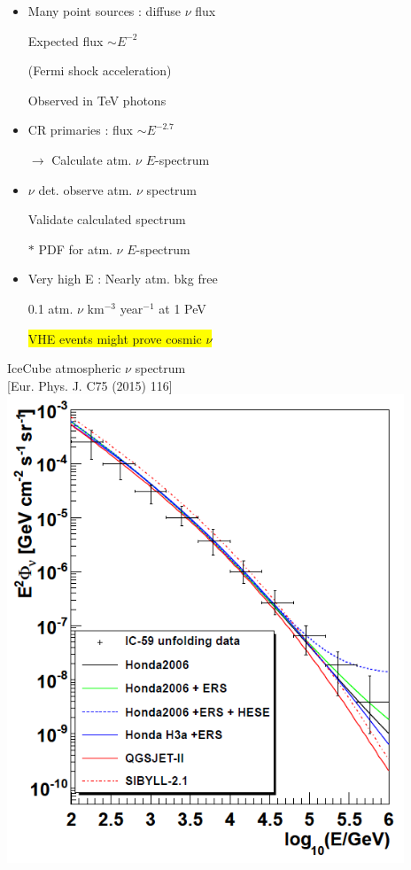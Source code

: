 \twocolumn
\begin{itemize}
\item Many point sources : diffuse $\nu$ flux
\item[] Expected flux $\sim E^{-2}$
\item[] (Fermi shock acceleration)
\item[] Observed in TeV photons
\item CR primaries : flux $\sim E^{-2.7}$
\item[] $\rightarrow$ Calculate atm. $\nu$ $E$-spectrum
\item $\nu$ det. observe atm. $\nu$ spectrum
\item[] Validate calculated spectrum
\item[$\ast$] {\blue PDF for atm. $\nu$ $E$-spectrum}
\item Very high E : Nearly atm. bkg free
\item[] 0.1 atm. $\nu$ km$^{-3}$ year$^{-1}$ at 1 PeV
\item[] \colorbox{yellow}{VHE events might prove cosmic $\nu$}
\end{itemize}

\newpage 

\begin{center}
{\blue IceCube atmospheric $\nu$ spectrum}\\
{\large [Eur. Phys. J. C75 (2015) 116]}\\
\includegraphics[keepaspectratio,height=14cm]{atm-nu2}
\end{center}

